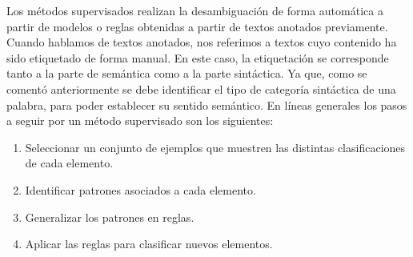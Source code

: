 Los métodos supervisados realizan la desambiguación de forma automática a partir de modelos o reglas obtenidas a partir de textos anotados previamente. Cuando hablamos de textos anotados, nos referimos a textos cuyo contenido ha sido etiquetado de forma manual. En este caso, la etiquetación se corresponde tanto a la parte de semántica como a la parte sintáctica. Ya que, como se comentó anteriormente se debe identificar el tipo de categoría sintáctica de una palabra, para poder establecer su sentido semántico. En líneas generales los pasos a seguir por un método supervisado son los siguientes:

  \begin{enumerate}
    \item Seleccionar un conjunto de ejemplos que muestren las distintas clasificaciones de cada elemento.
    \item Identificar patrones asociados a cada elemento.
    \item Generalizar los patrones en reglas.
    \item Aplicar las reglas para clasificar nuevos elementos. 
  \end{enumerate}


